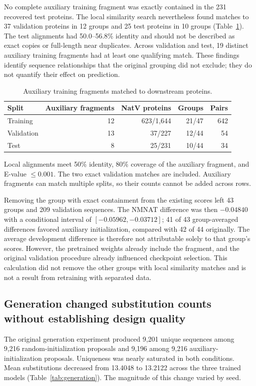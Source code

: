 \documentclass[referee,pdflatex,sn-vancouver-num]{sn-jnl}
\begin{document}
No complete auxiliary training fragment was exactly contained in the 231 recovered test proteins. The local similarity search nevertheless found matches to 37 validation proteins in 12 groups and 25 test proteins in 10 groups (Table~\ref{tab:overlap}). The test alignments had 50.0--56.8\% identity and should not be described as exact copies or full-length near duplicates. Across validation and test, 19 distinct auxiliary training fragments had at least one qualifying match. These findings identify sequence relationships that the original grouping did not exclude; they do not quantify their effect on prediction.

\begin{table}[htbp]
\caption{Auxiliary training fragments matched to downstream proteins.}\label{tab:overlap}
\centering
\begin{tabular}{lrrrr}
\toprule
Split & Auxiliary fragments & NatV proteins & Groups & Pairs \\
\midrule
Training & 12 & 623/1,644 & 21/47 & 642 \\
Validation & 13 & 37/227 & 12/44 & 54 \\
Test & 8 & 25/231 & 10/44 & 34 \\
\bottomrule
\end{tabular}
\par\smallskip\small Local alignments meet 50\% identity, 80\% coverage of the auxiliary fragment, and E-value $\leq0.001$. The two exact validation matches are included. Auxiliary fragments can match multiple splits, so their counts cannot be added across rows.
\end{table}

Removing the group with exact containment from the existing scores left 43 groups and 209 validation sequences. The NMNAT difference was then $-0.04840$ with a conditional interval of $[-0.05962,-0.03712]$; 41 of 43 group-averaged differences favored auxiliary initialization, compared with 42 of 44 originally. The average development difference is therefore not attributable solely to that group's scores. However, the pretrained weights already include the fragment, and the original validation procedure already influenced checkpoint selection. This calculation did not remove the other groups with local similarity matches and is not a result from retraining with separated data.

\subsection{Generation changed substitution counts without establishing design quality}
The original generation experiment produced 9,201 unique sequences among 9,216 random-initialization proposals and 9,196 among 9,216 auxiliary-initialization proposals. Uniqueness was nearly saturated in both conditions. Mean substitutions decreased from 13.4048 to 13.2122 across the three trained models (Table~\ref{tab:generation}). The magnitude of this change varied by seed.
\end{document}
